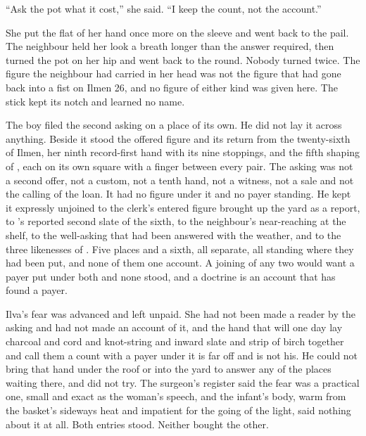 “Ask the pot what it cost,” she said. “I keep the count, not the account.”

She put the flat of her hand once more on the sleeve and went back to the pail. The neighbour held her look a breath longer than the answer required, then turned the pot on her hip and went back to the round. Nobody turned twice. The figure the neighbour had carried in her head was not the figure that had gone back into a fist on Ilmen 26, and no figure of either kind was given here. The stick kept its notch and learned no name.

\scenebreak

The boy filed the second asking on a place of its own. He did not lay it across anything. Beside it stood the offered figure and its return from the twenty-sixth of Ilmen, her ninth record-first hand with its nine stoppings, and the fifth shaping of , each on its own square with a finger between every pair. The asking was not a second offer, not a custom, not a tenth hand, not a witness, not a sale and not the calling of the loan. It had no figure under it and no payer standing. He kept it expressly unjoined to the clerk's entered figure brought up the yard as a report, to 's reported second slate of the sixth, to the neighbour's near-reaching at the shelf, to the well-asking that had been answered with the weather, and to the three likenesses of . Five places and a sixth, all separate, all standing where they had been put, and none of them one account. A joining of any two would want a payer put under both and none stood, and a doctrine is an account that has found a payer.

Ilva's fear was advanced and left unpaid. She had not been made a reader by the asking and had not made an account of it, and the hand that will one day lay charcoal and cord and knot-string and inward slate and strip of birch together and call them a count with a payer under it is far off and is not his. He could not bring that hand under the roof or into the yard to answer any of the places waiting there, and did not try. The surgeon's register said the fear was a practical one, small and exact as the woman's speech, and the infant's body, warm from the basket's sideways heat and impatient for the going of the light, said nothing about it at all. Both entries stood. Neither bought the other.

